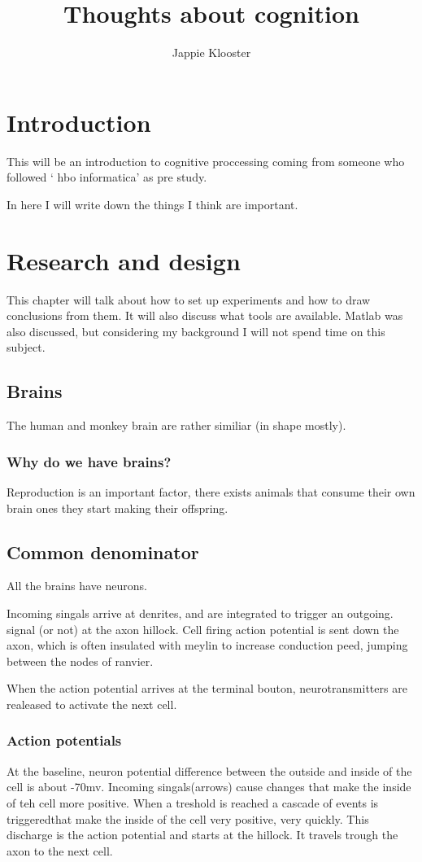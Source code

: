 \documentclass{article}
\begin{document}
\lstset{language=Java}
\author{Jappie Klooster}
\title{Thoughts about cognition}
\maketitle

\section{Introduction}
This will be an introduction to cognitive proccessing
coming from someone who followed
` hbo informatica' as pre study.

In here I will write down the things I think are important.

\section{Research and design}
This chapter will talk about how to set up experiments and how to draw
conclusions from them. It will also discuss what tools are available.
Matlab was also discussed, but considering my background I will not spend
time on this subject.

\subsection{Brains}
The human and monkey brain are rather similiar (in shape mostly).

\subsubsection{Why do we have brains?}
Reproduction is an important factor, there exists animals that consume their
own brain ones they start making their offspring.

\subsection{Common denominator}
All the brains have neurons.

Incoming singals arrive at denrites, and are integrated to trigger an outgoing.
signal (or not) at the axon hillock.
Cell firing action potential is sent down the axon, which is often insulated
with meylin to increase conduction peed, jumping between the nodes of ranvier.

When the action potential arrives at the terminal bouton, neurotransmitters
are realeased to activate the next cell.

\subsubsection{Action potentials}
At the baseline, neuron potential difference between the outside and inside
of the cell is about -70mv. Incoming singals(arrows) cause changes that
make the inside of teh cell more positive. When a treshold is reached a
cascade of events is triggeredthat make the inside of the cell very positive,
very quickly. This discharge is the action potential and starts at the hillock.
It travels trough the axon to the next cell.
\end{document}
